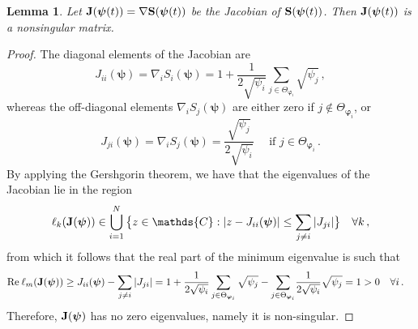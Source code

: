 \documentclass[a4paper,notitlepage,onecolumn]{article}
\def\C{\mathds{C}}
\def\S{{\bf S}}
\def\J{{\bf J}}
\def\psib{\boldsymbol{\psi}}
\def\varphib{\boldsymbol{\varphi}}
\newtheorem{lemma}[theorem]{Lemma}
\numberwithin{equation}{section}
\begin{document}
\begin{lemma} \label{lemma:Jacob}
Let $\J(\psib(t))=\nabla \S(\psib(t))$ be the Jacobian of $\S(\psib(t))$. Then $\J(\psib(t))$ is a nonsingular matrix.
\end{lemma}
\begin{proof}
The diagonal elements of the Jacobian are
$$
J_{ii}(\psib)= \nabla_i S_i(\psib) = 1+\frac{1}{2\sqrt{\psi_i}}\sum_{j\in \Theta_{\varphib_i}}\sqrt{\psi_j}\,,
$$
whereas the off-diagonal elements $\nabla_i S_j(\psib)$ are either
zero if $j \notin \Theta_{\varphib_i}$, or
$$
J_{ji}(\psib)=\nabla_i S_j(\psib)=\frac{\sqrt{\psi_j}}{2\sqrt{\psi_i}}\quad \mbox{ if } j\in \Theta_{\varphib_i} \,.
$$
By applying the Gershgorin theorem, we have that the eigenvalues of the Jacobian lie in the region
\begin{align*}
    \ell_k(\mathbf{J}(\psib)) \in \bigcup_{i=1}^N \big{\{}z \in \C : |z-J_{ii}(\psib) | \leq \sum_{j \neq i } |J_{ji}|\big \} \quad \forall k\,,
\end{align*}
from which it follows that the real part of the minimum eigenvalue is such that
\begin{align*}
    {\rm Re }\: \ell_m(\J(\psib)) & \geq J_{ii}(\psib) - \sum_{j \neq i } |J_{ji}|  = 1+\frac{1}{2\sqrt{\psi_i}}\sum_{j\in \Theta_{\varphib_i}}\sqrt{\psi_j} - {\sum_{j\in \Theta_{\varphib_i}}} \frac{1}{2\sqrt{\psi_i}} \sqrt{\psi_j} = 1 >0 \quad \forall i\,.
\end{align*}
Therefore, $\J(\psib)$ has no zero eigenvalues, namely it is non-singular.
\end{proof}
\end{document}
